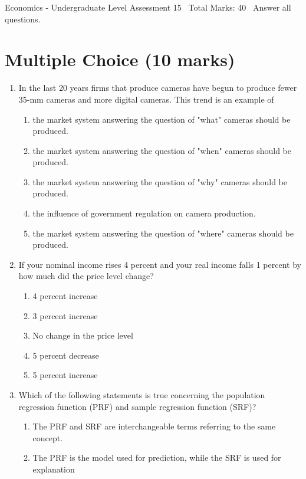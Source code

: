 \documentclass[12pt]{article}
\begin{document}
\begin{center}
Economics - Undergraduate Level Assessment 15 \
Total Marks: 40 \
Answer all questions.
\end{center}

\section*{Multiple Choice (10 marks)}
\begin{enumerate}[label=\arabic*.]
\item In the last 20 years firms that produce cameras have begun to produce fewer 35-mm cameras and more digital cameras. This trend is an example of
\begin{enumerate}[label=(\alph*)]
    \item the market system answering the question of "what" cameras should be produced.
    \item the market system answering the question of "when" cameras should be produced.
    \item the market system answering the question of "why" cameras should be produced.
    \item the influence of government regulation on camera production.
    \item the market system answering the question of "where" cameras should be produced.
\end{enumerate}
\item If your nominal income rises 4 percent and your real income falls 1 percent by how much did the price level change?
\begin{enumerate}[label=(\alph*)]
    \item 4 percent increase
    \item 3 percent increase
    \item No change in the price level
    \item 5 percent decrease
    \item 5 percent increase
\end{enumerate}
\item Which of the following statements is true concerning the population regression function (PRF) and sample regression function (SRF)?
\begin{enumerate}[label=(\alph*)]
    \item The PRF and SRF are interchangeable terms referring to the same concept.
    \item The PRF is the model used for prediction, while the SRF is used for explanation

\end{enumerate}
\end{enumerate}
\end{document}
